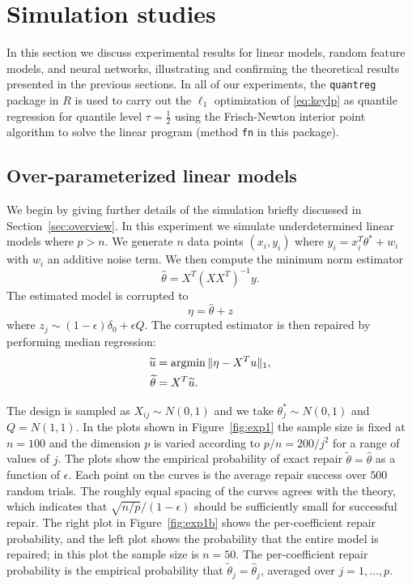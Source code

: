 
\section{Simulation studies}
\label{sec:experiments}

In this section we discuss experimental results for linear models, random feature models, and neural networks, illustrating and confirming the theoretical results presented in the previous sections.
In all of our experiments, the \texttt{quantreg} package in $R$ is used to carry out the $\ell_1$ optimization of \eqref{eq:keylp} as quantile regression for quantile level $\tau = \frac{1}{2}$ using the Frisch-Newton interior point algorithm to solve the linear program (method \texttt{fn} in this package).


\subsection{Over-parameterized linear models}


We begin by giving further details of the simulation briefly discussed
in Section~\ref{sec:overview}. In this experiment we simulate underdetermined linear models where $p > n$.
We generate $n$ data points $(x_i, y_i)$ where
$y_i = x_i^T \theta^* + w_i$ with $w_i$ an additive noise term. We then compute the minimum norm estimator
\begin{equation*}
  \hat\theta = X^T (X X^T)^{-1} y.
\end{equation*}
The estimated model is corrupted to
\begin{equation*}
  \eta = \hat\theta + z
\end{equation*}
where $z_j \sim (1-\epsilon) \delta_0 +\epsilon Q$. The corrupted estimator is then repaired by performing median regression:
\begin{align*}
  \tilde u &= \argmin \|\eta - X^T u\|_1, \\
  \tilde \theta &= X^T \tilde u.
\end{align*}

The design is sampled as $X_{ij} \sim N(0,1)$ and we take $\theta_j^* \sim N(0,1)$ and $Q = N(1,1)$. In the plots shown
in Figure~\ref{fig:exp1} the sample size is fixed at $n=100$ and the dimension $p$ is varied according to $p/n=200/j^2$
for a range of values of $j$. The plots show the empirical probability of exact repair $\tilde\theta = \hat\theta$ as a function of $\epsilon$. Each point on the curves is the average repair success over $500$ random trials.
The roughly equal spacing of the curves agrees with the theory, which indicates that $\sqrt{n/p}/(1-\epsilon)$ should be sufficiently small for successful repair. The right plot in Figure~\ref{fig:exp1b} shows the per-coefficient repair probability, and the left plot shows the probability that the entire model is repaired; in this plot the sample size is $n=50$. The per-coefficient repair probability is the empirical probability that $\tilde \theta_j = \hat\theta_j$, averaged over $j=1,\ldots, p$.

